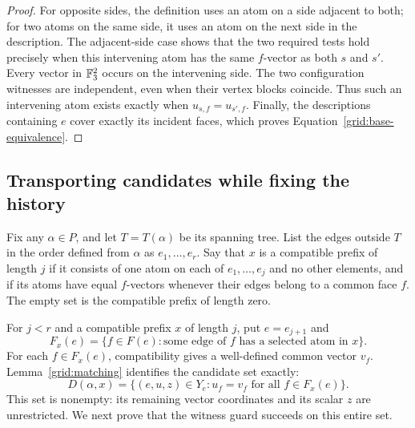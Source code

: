 \begin{proof}
For opposite sides, the definition uses an atom on a side adjacent to
both; for two atoms on the same side, it uses an atom on the next side
in the description.  The adjacent-side case shows that the two required
tests hold precisely when this intervening atom has the same $f$-vector
as both $s$ and $s'$.  Every vector in $\mathbb F_3^2$ occurs on the intervening
side.  The two configuration witnesses are independent, even when their
vertex blocks coincide.  Thus such an intervening atom exists exactly
when $u_{s,f}=u_{s',f}$.  Finally, the descriptions containing $e$ cover
exactly its incident faces, which proves
Equation~\eqref{grid:base-equivalence}.
\end{proof}

\subsection{Transporting candidates while fixing the history}

Fix any $\alpha\in P$, and let $T=T(\alpha)$ be its spanning tree.
List the edges outside $T$ in the order defined from $\alpha$ as
$e_1,\ldots,e_r$.  Say that $x$ is a compatible prefix of length $j$
if it consists of one atom on each of $e_1,\ldots,e_j$ and no other
elements, and if its atoms have equal $f$-vectors whenever their edges
belong to a common face $f$.  The empty set is the compatible prefix of
length zero.

For $j<r$ and a compatible prefix $x$ of length $j$, put $e=e_{j+1}$
and
\[
 F_x(e)=\{f\in F(e):\text{some edge of }f\text{ has a selected atom in }x\}.
\]
For each $f\in F_x(e)$, compatibility gives a well-defined common vector
$v_f$.  Lemma~\ref{grid:matching} identifies the candidate set exactly:
\begin{equation}\label{grid:candidates}
 D(\alpha,x)=\{(e,u,z)\in Y_e:
                    u_f=v_f\text{ for all }f\in F_x(e)\}.
\end{equation}
This set is nonempty: its remaining vector coordinates and its scalar
$z$ are unrestricted.  We next prove that the witness guard succeeds on
this entire set.

